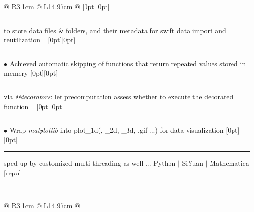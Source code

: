 {{\begin{tabularx}{\linewidth}{@{} R{3.1cm} @{\phantom{d}} L{14.97cm} @{}}
\newline \vspace{-3pt} \hspace{12.5pt} \raisebox{0.18\height}[0pt][0pt]{\vrule width0.5pt height15.0pt} \hspace{-0.26em}\rule[0.25em]{1.0em}{0.5pt}\!\! \raisebox{0.2\height}{\scriptsize $\blacktriangleright$} {\small to store data files \& folders, and their metadata for swift data import and reutilization} \newline \vspace{-3pt} \ \hspace{-3pt} \raisebox{0.06\height}[0pt][0pt]{\vrule width0.5pt height45.0pt} \hspace{-0.26em}\rule[0.25em]{1.0em}{0.5pt}\!\! $\bullet$ {\small Achieved automatic skipping of functions that return repeated values stored in memory} \newline \vspace{-3pt} \hspace{12.5pt} \raisebox{0.18\height}[0pt][0pt]{\vrule width0.5pt height15.0pt} \hspace{-0.26em}\rule[0.25em]{1.0em}{0.5pt}\!\! \raisebox{0.2\height}{\scriptsize $\blacktriangleright$} {\small via \textit{@decorators}: let precomputation assess whether to execute the decorated function} \newline \vspace{-3pt} \ \hspace{-3pt} \raisebox{0.06\height}[0pt][0pt]{\vrule width0.5pt height45.0pt} \hspace{-0.26em}\rule[0.25em]{1.0em}{0.5pt}\!\! $\bullet$ {\small Wrap \textit{matplotlib} into plot\_1d(, \_2d, \_3d, .gif ...) for data visualization} \newline \vspace{-3pt} \hspace{12.5pt} \raisebox{0.18\height}[0pt][0pt]{\vrule width0.5pt height15.0pt} \hspace{-0.26em}\rule[0.25em]{1.0em}{0.5pt}\!\! \raisebox{0.2\height}{\scriptsize $\blacktriangleright$} {\small sped up by customized multi-threading as well ...} \hfill {\small \color{color-detail} Python $|$ SiYuan $|$ Mathematica} \href{https://github.com/ChenZhu-Xie/NLAST}{\small [repo]} \\ \Gap\Gap\Gap
\end{tabularx}
\\
\begin{tabularx}{\linewidth}{@{} R{3.1cm} @{\phantom{d}} L{14.97cm} @{}}

\end{tabularx}}}
